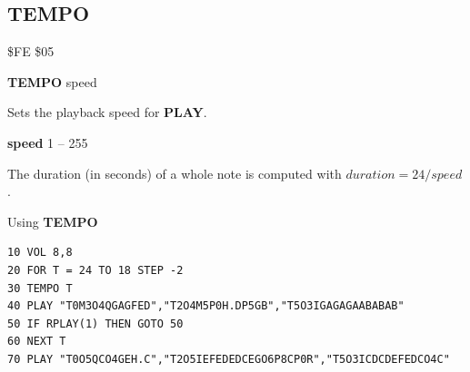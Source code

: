 
\newpage
\subsection{TEMPO}
\begin{description}[leftmargin=2cm,style=nextline]
\item [Token:] \$FE \$05
\item [Format:] {\bf TEMPO} speed
\item [Usage:] Sets the playback speed for {\bf PLAY}.

               {\bf speed} 1 -- 255

               The duration (in seconds) of a whole note is computed with
               $ duration = 24 / speed $.

\item [Example:] Using {\bf TEMPO}
\begin{tcolorbox}[colback=black,coltext=white]
\verbatimfont{\codefont}
\begin{verbatim}
10 VOL 8,8
20 FOR T = 24 TO 18 STEP -2
30 TEMPO T
40 PLAY "T0M3O4QGAGFED","T2O4M5P0H.DP5GB","T5O3IGAGAGAABABAB"
50 IF RPLAY(1) THEN GOTO 50
60 NEXT T
70 PLAY "T0O5QCO4GEH.C","T2O5IEFEDEDCEGO6P8CP0R","T5O3ICDCDEFEDCO4C"
\end{verbatim}
\end{tcolorbox}
\end{description}


\newpage
